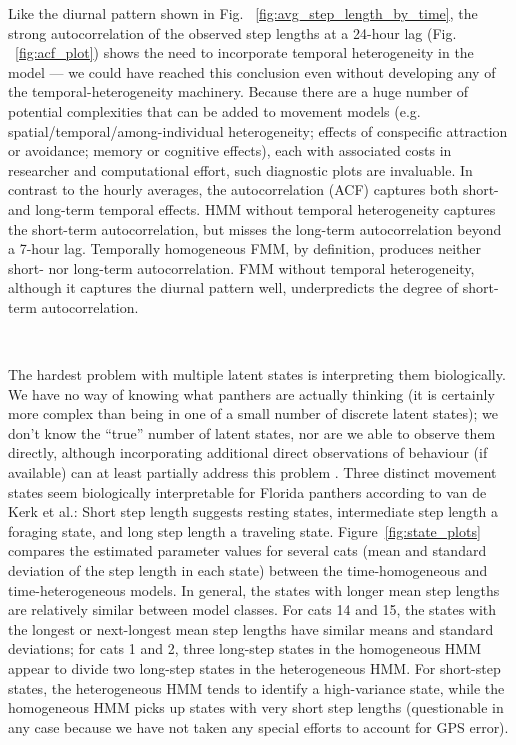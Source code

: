 \documentclass{bmcart}
\begin{document}
Like the diurnal pattern shown in Fig. ~\ref{fig:avg_step_length_by_time},
the strong autocorrelation of the observed step lengths at a 24-hour lag (Fig. ~\ref{fig:acf_plot}) shows the need to incorporate temporal heterogeneity in the model --- we could have reached this conclusion even without developing any of the temporal-heterogeneity machinery.
Because there are a huge number of potential complexities that can be added to movement models (e.g. spatial/temporal/among-individual heterogeneity; effects of conspecific attraction or avoidance; memory or cognitive effects), each with associated costs in researcher and computational effort, such diagnostic plots are invaluable. In contrast to the hourly averages, the autocorrelation (ACF) captures both short- and long-term temporal effects. HMM without temporal heterogeneity captures the short-term autocorrelation, but misses the long-term autocorrelation beyond a 7-hour lag.
Temporally homogeneous FMM, by definition, produces neither short- nor long-term autocorrelation. FMM without temporal heterogeneity, although it captures the diurnal pattern well, underpredicts the degree of short-term autocorrelation.

\

The hardest problem with multiple latent states is interpreting them
biologically. We have no way of knowing what panthers are actually
thinking (it is certainly more complex than being in one of a small
number of discrete latent states); 
we don't know the ``true'' number of latent states,
nor are we able to observe them directly, although
incorporating additional direct observations of 
behaviour (if available) can at least partially
address this problem \cite{fryxell_multiple_2008}.
Three distinct
movement states seem biologically interpretable for Florida panthers
according to van de Kerk et al.\cite{kerk2015hidden}: Short step length suggests resting
states, intermediate step length a foraging state, and long
step length a traveling state. 
Figure~\ref{fig:state_plots} compares the estimated parameter values
for several cats
(mean and standard deviation of the step length in each state) between
the time-homogeneous and time-heterogeneous models. 
In general, the states with longer mean step lengths are relatively
similar between model classes. For cats 14 and 15, the states with
the longest or next-longest mean step lengths have similar means
and standard deviations; for cats 1 and 2, three long-step states
in the homogeneous HMM appear to divide two long-step states in 
the heterogeneous HMM. For short-step states, the heterogeneous HMM
tends to identify a high-variance state, while the homogeneous HMM
picks up states with very short step lengths (questionable in any
case because we have not taken any special efforts to account for
GPS error).
\end{document}
